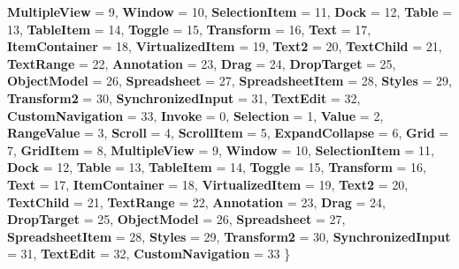 \begin{DoxyCompactItemize}
{\bfseries Multiple\+View} = 9, 
\newline
{\bfseries Window} = 10, 
{\bfseries Selection\+Item} = 11, 
{\bfseries Dock} = 12, 
{\bfseries Table} = 13, 
\newline
{\bfseries Table\+Item} = 14, 
{\bfseries Toggle} = 15, 
{\bfseries Transform} = 16, 
{\bfseries Text} = 17, 
\newline
{\bfseries Item\+Container} = 18, 
{\bfseries Virtualized\+Item} = 19, 
{\bfseries Text2} = 20, 
{\bfseries Text\+Child} = 21, 
\newline
{\bfseries Text\+Range} = 22, 
{\bfseries Annotation} = 23, 
{\bfseries Drag} = 24, 
{\bfseries Drop\+Target} = 25, 
\newline
{\bfseries Object\+Model} = 26, 
{\bfseries Spreadsheet} = 27, 
{\bfseries Spreadsheet\+Item} = 28, 
{\bfseries Styles} = 29, 
\newline
{\bfseries Transform2} = 30, 
{\bfseries Synchronized\+Input} = 31, 
{\bfseries Text\+Edit} = 32, 
{\bfseries Custom\+Navigation} = 33, 
\newline
{\bfseries Invoke} = 0, 
{\bfseries Selection} = 1, 
{\bfseries Value} = 2, 
{\bfseries Range\+Value} = 3, 
\newline
{\bfseries Scroll} = 4, 
{\bfseries Scroll\+Item} = 5, 
{\bfseries Expand\+Collapse} = 6, 
{\bfseries Grid} = 7, 
\newline
{\bfseries Grid\+Item} = 8, 
{\bfseries Multiple\+View} = 9, 
{\bfseries Window} = 10, 
{\bfseries Selection\+Item} = 11, 
\newline
{\bfseries Dock} = 12, 
{\bfseries Table} = 13, 
{\bfseries Table\+Item} = 14, 
{\bfseries Toggle} = 15, 
\newline
{\bfseries Transform} = 16, 
{\bfseries Text} = 17, 
{\bfseries Item\+Container} = 18, 
{\bfseries Virtualized\+Item} = 19, 
\newline
{\bfseries Text2} = 20, 
{\bfseries Text\+Child} = 21, 
{\bfseries Text\+Range} = 22, 
{\bfseries Annotation} = 23, 
\newline
{\bfseries Drag} = 24, 
{\bfseries Drop\+Target} = 25, 
{\bfseries Object\+Model} = 26, 
{\bfseries Spreadsheet} = 27, 
\newline
{\bfseries Spreadsheet\+Item} = 28, 
{\bfseries Styles} = 29, 
{\bfseries Transform2} = 30, 
{\bfseries Synchronized\+Input} = 31, 
\newline
{\bfseries Text\+Edit} = 32, 
{\bfseries Custom\+Navigation} = 33
 \}
\item 
\mbox{\label{namespace_windows_1_1_u_i_1_1_xaml_1_1_automation_1_1_peers_a545d04e5cb3e01155ab597d749495a0f}} 

\end{DoxyCompactItemize}
